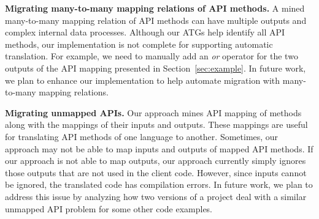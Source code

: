 
\textbf{Migrating many-to-many mapping relations of API methods.}
A mined many-to-many mapping relation of API methods can have multiple outputs
and complex internal data processes. Although our ATGs
help identify all API methods, our implementation is not complete
for supporting automatic translation. For example, we need to manually add an
\emph{or} operator for the two outputs of the API mapping presented
in Section~\ref{sec:example}. In future work, we plan to enhance our implementation to help
automate migration with many-to-many mapping relations.

\textbf{Migrating unmapped APIs.} Our approach mines API mapping of
methods along with the mappings of their inputs and outputs. These
mappings are useful for translating API methods of one language to
another. Sometimes, our approach may not be able to map inputs and
outputs of mapped API methods. If our approach is not able to map
outputs, our approach currently simply ignores those outputs that are not used
in the client code. However, since inputs cannot be ignored, the
translated code has compilation errors. In future work, we
plan to address this issue by analyzing how two versions of a
project deal with a similar unmapped API problem for some other code
examples. 